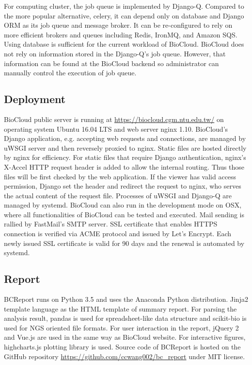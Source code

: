 

For computing cluster, the job queue is implemented by Django-Q. Compared to
the more popular alternative, celery, it can depend only on database and Django
ORM as its job queue and message broker. It can be re-configured to rely on
more efficient brokers and queues including Redis, IronMQ, and Amazon SQS.
Using database is sufficient for the current workload of BioCloud. BioCloud
does not rely on information stored in the Django-Q's job queue. However, that
information can be found at the BioCloud backend so administrator can manually
control the execution of job queue.


\subsection{Deployment}


BioCloud public server is running at \url{https://biocloud.cgm.ntu.edu.tw/} on
operating system Ubuntu 16.04 LTS and web server nginx 1.10. BioCloud's Django
application, e.g. accepting web requests and connections, are managed by uWSGI
server and then reversely proxied to nginx. Static files are hosted directly by
nginx for efficiency. For static files that require Django authentication,
nginx's X-Accel HTTP request header is added to allow the internal routing.
Thus those files will be first checked by the web application. If the viewer
has valid access permission, Django set the header and redirect the request to
nginx, who serves the actual content of the request file. Processes of uWSGI
and Django-Q are managed by systemd. BioCloud can also run in the development
mode on OSX, where all functionalities of BioCloud can be tested and executed.
Mail sending is rallied by FastMail's SMTP server. SSL certificate that enables
HTTPS connection is verified via ACME protocol and issued by Let's Encrypt.
Each newly issued SSL certificate is valid for 90 days and the renewal is
automated by systemd.


\subsection{Report}


BCReport runs on Python 3.5 and uses the Anaconda Python distribution. Jinja2
template language as the HTML template of summary report. For parsing the
analysis result, pandas is used for spreadsheet-like data structure and
scikit-bio is used for NGS oriented file formats. For user interaction in the
report, jQuery 2 and Vue.js are used in the same way as BioCloud website. For
interactive figures, highcharts.js plotting library is used. Source code of
BCReport is hosted on the GitHub repository
\url{https://github.com/ccwang002/bc_report} under MIT license.

